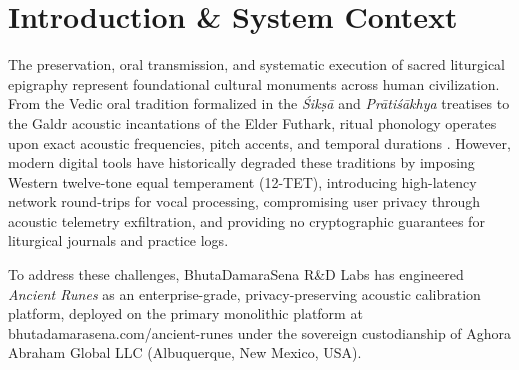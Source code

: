 \documentclass[11pt,a4paper,reqno]{article}
\def\texttt#1{#1}%
\theoremstyle{plain}
\theoremstyle{definition}
\theoremstyle{remark}
\numberwithin{equation}{section}
\begin{document}
\vspace{1.2em}

\section{\texorpdfstring{Introduction \& System Context}{Introduction and System Context}}
\label{sec:intro}

The preservation, oral transmission, and systematic execution of sacred liturgical epigraphy represent foundational cultural monuments across human civilization. From the Vedic oral tradition formalized in the \emph{\'{S}ik\d{s}\={a}} and \emph{Pr\={a}ti\'{s}\={a}khya} treatises to the Galdr acoustic incantations of the Elder Futhark, ritual phonology operates upon exact acoustic frequencies, pitch accents, and temporal durations \cite{scharfe2002education, macdonell1916vedic, page1999runes}. However, modern digital tools have historically degraded these traditions by imposing Western twelve-tone equal temperament (12-TET), introducing high-latency network round-trips for vocal processing, compromising user privacy through acoustic telemetry exfiltration, and providing no cryptographic guarantees for liturgical journals and practice logs.

To address these challenges, BhutaDamaraSena R\&D Labs has engineered \emph{Ancient Runes} as an enterprise-grade, privacy-preserving acoustic calibration platform, deployed on the primary monolithic platform at \texttt{bhutadamarasena.com/ancient-runes} under the sovereign custodianship of Aghora Abraham Global LLC (Albuquerque, New Mexico, USA).
\end{document}
